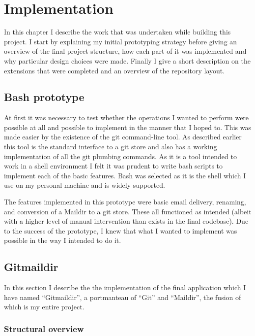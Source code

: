 \chapter{Implementation}

In this chapter I describe the work that was undertaken while building this project. I start by explaining my initial prototyping strategy before giving an overview of the final project structure, how each part of it was implemented and why particular design choices were made. Finally I give a short description on the extensions that were completed and an overview of the repository layout.

\section{Bash prototype}

At first it was necessary to test whether the operations I wanted to perform were possible at all and possible to implement in the manner that I hoped to. This was made easier by the existence of the git command-line tool. As described earlier this tool is the standard interface to a git store and also has a working implementation of all the git plumbing commands. As it is a tool intended to work in a shell environment I felt it was prudent to write bash scripts to implement each of the basic features. Bash was selected as it is the shell which I use on my personal machine and is widely supported.

The features implemented in this prototype were basic email delivery, renaming, and conversion of a Maildir to a git store. These all functioned as intended (albeit with a higher level of manual intervention than exists in the final codebase). Due to the success of the prototype, I knew that what I wanted to implement was possible in the way I intended to do it.

\section{Gitmaildir}

In this section I describe the the implementation of the final application which I have named ``Gitmaildir'', a portmanteau of ``Git'' and ``Maildir'', the fusion of which is my entire project.

\subsection{Structural overview}

